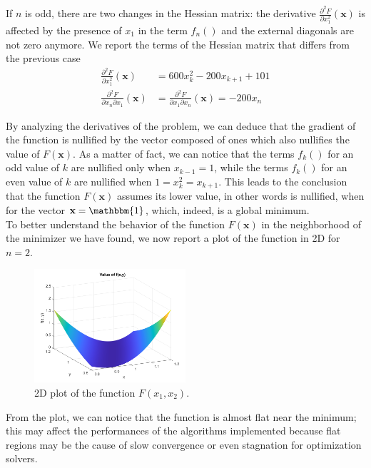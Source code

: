 If $n$ is odd, there are two changes in the Hessian matrix: the derivative $\frac{\partial^2 F}{\partial x_1^2} (\mathbf{x}) $ is affected by the presence of $x_1$ in the term $f_n()$ and the external diagonals are not zero anymore. We report the terms of the Hessian matrix that differs from the previous case
\begin{align*}
    \frac{\partial^2 F}{\partial x_1^2}  (\mathbf{x}) &= 600x_k^2 - 200x_{k+1} + 101 \\
    \frac{\partial^2 F}{\partial x_n \partial x_1} (\mathbf{x}) &= \frac{\partial^2 F}{\partial x_1 \partial x_n} (\mathbf{x}) = -200x_n
\end{align*}

By analyzing the derivatives of the problem, we can deduce that the gradient of the function is nullified by the vector composed of ones which also nullifies the value of $F(\mathbf{x})$. 
As a matter of fact, we can notice that the terms $f_k()$ for an odd value of $k$ are nullified only when $x_{k - 1} = 1$, while the terms $f_k()$ for an even value of $k$ are nullified when $1 = x_k^2 = x_{k+1}$. This leads to the conclusion that the function $F(\mathbf{x})$ assumes its lower value, in other words is nullified, when for the vector $\mathbf{x} = \mathbbm{1}$, which, indeed, is a global minimum.
\\ To better understand the behavior of the function $F(\mathbf{x})$ in the neighborhood of the minimizer we have found, we now report a plot of the function in 2D for $n = 2$. 
\begin{figure}[H]
    \centering
    \includegraphics[width=0.5\textwidth]{img/pb25_fig.png}
    \caption{2D plot of the function $F(x_1, x_2)$.}
\end{figure}
From the plot, we can notice that the function is almost flat near the minimum; this may affect the performances of the algorithms implemented because flat regions may be the cause of slow convergence or even stagnation for optimization solvers. 

 
\medskip
